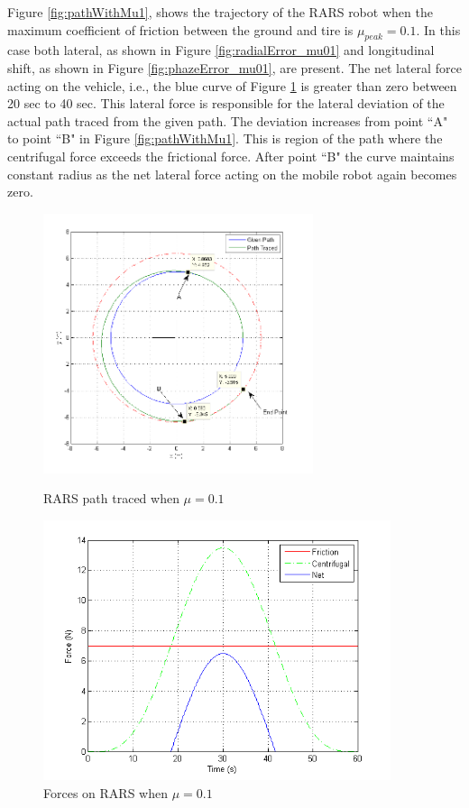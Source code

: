  Figure \ref{fig:pathWithMu1}, shows the trajectory of the RARS robot when the maximum coefficient of friction between the ground and tire is  $\mu_{peak} =0.1$. 
 In this case both lateral, as shown in Figure \ref{fig:radialError_mu01} and longitudinal shift, as shown in Figure \ref{fig:phazeError_mu01}, are present. The  net lateral force acting on the vehicle, i.e., the blue curve of Figure \ref{fig:ForcesMu1} is greater than zero between 20 sec to 40 sec. This lateral force is responsible for the lateral deviation of the actual path traced from the given path. The deviation increases from point ``A" to point ``B" in Figure \ref{fig:pathWithMu1}. This is region of the path where the centrifugal force exceeds the frictional force. After point ``B" the curve maintains constant radius as the net lateral force acting on the mobile robot again becomes zero. 
\begin{figure}
	\begin{minipage}[t]{0.5\textwidth}
		\centering
		\includegraphics[height=3in]{Chapter4/fig/PathWithMu-1slip}
		\caption{RARS path traced when $\mu=0.1$}\label{fig:pathWithMu1}
	\end{minipage}
	\hfill
	\begin{minipage}[t]{0.5\textwidth}
		\centering
		\includegraphics[height=3in,width=\textwidth]{Chapter4/fig/ForceMu-1}
		\caption{Forces on RARS when $\mu=0.1$ }\label{fig:ForcesMu1}
	\end{minipage}
	
\end{figure}
